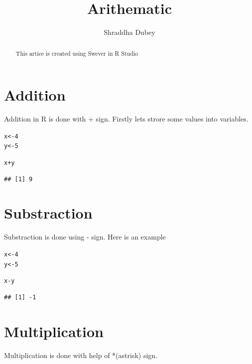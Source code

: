 \documentclass{article}\usepackage[]{graphicx}\usepackage[]{color}
\makeatletter
\newcommand{\hlnum}[1]{\textcolor[rgb]{0.686,0.059,0.569}{#1}}%
\newcommand{\hlopt}[1]{\textcolor[rgb]{0,0,0}{#1}}%
\newcommand{\hlstd}[1]{\textcolor[rgb]{0.345,0.345,0.345}{#1}}%
\newcommand{\hlkwb}[1]{\textcolor[rgb]{0.69,0.353,0.396}{#1}}%
\newenvironment{kframe}{%
 \def\at@end@of@kframe{}%
 \ifinner\ifhmode%
  \def\at@end@of@kframe{\end{minipage}}%
  \begin{minipage}{\columnwidth}%
 \fi\fi%
 \def\FrameCommand##1{\hskip\@totalleftmargin \hskip-\fboxsep
 \colorbox{shadecolor}{##1}\hskip-\fboxsep
     \hskip-\linewidth \hskip-\@totalleftmargin \hskip\columnwidth}%
 \MakeFramed {\advance\hsize-\width
   \@totalleftmargin\z@ \linewidth\hsize
   \@setminipage}}%
 {\par\unskip\endMakeFramed%
 \at@end@of@kframe}
\newenvironment{knitrout}{}{} %
\makeatother
\begin{document}
\title{Arithematic}
\author{Shraddha Dubey}
\maketitle

\begin{abstract}
This artice is created using Swever in R Studio
\end{abstract}

\section{Addition}
\noindent Addition in R is done with + sign. Firstly lets strore some values into variables.

\begin{knitrout}
\color{fgcolor}\begin{kframe}
\begin{alltt}
\hlstd{x}\hlkwb{<-}\hlnum{4}
\hlstd{y}\hlkwb{<-}\hlnum{5}

\hlstd{x}\hlopt{+}\hlstd{y}
\end{alltt}
\begin{verbatim}
## [1] 9
\end{verbatim}
\end{kframe}
\end{knitrout}

\section{Substraction}
Substraction is done using - sign. Here is an example

\begin{knitrout}
\color{fgcolor}\begin{kframe}
\begin{alltt}
\hlstd{x}\hlkwb{<-}\hlnum{4}
\hlstd{y}\hlkwb{<-}\hlnum{5}

\hlstd{x}\hlopt{-}\hlstd{y}
\end{alltt}
\begin{verbatim}
## [1] -1
\end{verbatim}
\end{kframe}
\end{knitrout}

\section{Multiplication}
\noindent Multiplication is done with help of *(astrisk) sign.
\end{document}
